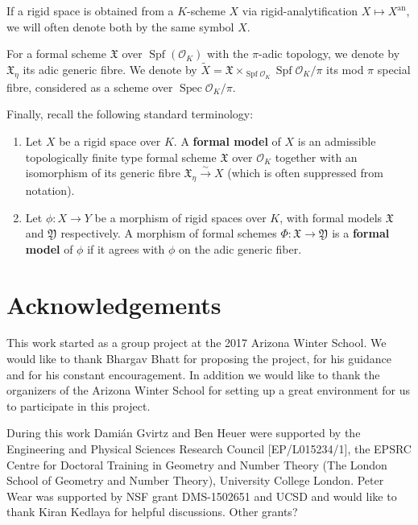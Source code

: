 \documentclass[10pt,oneside]{amsart}
\theoremstyle{definition}
\begin{document}
	If a rigid space is obtained from a $K$-scheme $X$ via rigid-analytification $X\mapsto X^{\operatorname{an}}$, we will often denote both by the same symbol $X$.
 
	For a formal scheme $\mathfrak X$ over $\operatorname{Spf}(\mathcal O_K)$ with the $\pi$-adic topology, we denote by $\mathfrak X_\eta$ its adic generic fibre. 
	We denote by $\tilde{X}=\mathfrak X\times_{\operatorname{Spf}\mathcal O_K}\operatorname{Spf}\mathcal O_K/\pi$ its mod $\pi$ special fibre, considered as a scheme over $\operatorname{Spec}\mathcal O_K/\pi$. 

	Finally, recall the following standard terminology: 
		\begin{enumerate}
			\item Let $X$ be a rigid space over $K$. A \textbf{formal model} of $X$ is an admissible topologically finite type formal scheme $\mathfrak X$ over $\mathcal O_K$ together with an isomorphism of its generic fibre $\mathfrak X_\eta \xrightarrow{\sim} X$ (which is often suppressed from notation).
			\item Let $\phi:  X\rightarrow  Y$ be a morphism of rigid spaces over $K$, with formal models $\mathfrak X$ and $\mathfrak Y$	respectively. A morphism of formal schemes $\Phi:\mathfrak X \rightarrow \mathfrak Y$ is a \textbf{formal model} of $\phi$ if it agrees with $\phi$ on the adic generic fiber. 
		\end{enumerate}




\section*{Acknowledgements}
This work started as a group project at the 2017 Arizona Winter School. We would like to thank Bhargav Bhatt for proposing the project, for his guidance and for his constant encouragement. In addition we would like to thank the organizers of the Arizona Winter School for setting up a great environment for us to participate in this project. 

During this work Dami\'an Gvirtz and Ben Heuer were supported by the Engineering and Physical Sciences Research Council [EP/L015234/1], the EPSRC Centre for Doctoral Training in Geometry and Number Theory (The London School of Geometry and Number Theory), University College London. 
Peter Wear was supported by NSF grant DMS-1502651 and UCSD and would like to thank Kiran Kedlaya for helpful discussions.
{\color{red} Other grants?}
\end{document}
